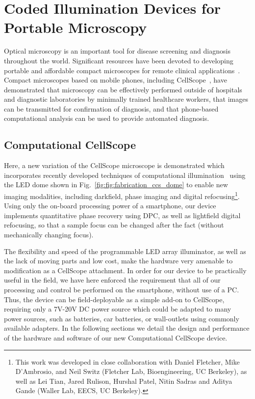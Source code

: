 \section{Coded Illumination Devices for Portable Microscopy}
Optical microscopy is an important tool for disease screening and diagnosis throughout the world. Significant resources have been devoted to developing portable and affordable compact microscopes for remote clinical applications~\cite{Zhu2011, switz2014low, smith2011cell, maamari2013mobile,C4LC00010B,Vashist2014, steenblik2005lenses, cybulski2014foldscope, boppart2014point, Greenbaum17122014, mudanyali2010compact, tseng2010lensfree}.
Compact microscopes based on mobile phones, including CellScope~\cite{breslauer2009mobile, skandarajah2014quantitative}, have demonstrated that microscopy can be effectively performed outside of hospitals and diagnostic laboratories by minimally trained healthcare workers, that images can be transmitted for confirmation of diagnosis, and that phone-based computational analysis can be used to provide automated diagnosis.

\subsection{Computational CellScope}\label{sec:fabrication:ccs}
Here, a new variation of the CellScope microscope is demonstrated which incorporates recently developed techniques of computational illumination~\cite{Zheng2011, Tian14, zijiMulti} using the LED dome shown in Fig.~\ref{fig:fig:fabrication_ccs_dome} to enable new imaging modalities, including darkfield, phase imaging and digital refocusing\footnote{This work was developed in close collaboration with Daniel Fletcher, Mike D'Ambrosio, and Neil Switz (Fletcher Lab, Bioengineering, UC Berkeley), as well as Lei Tian, Jared Rulison, Hurshal Patel, Nitin Sadras and Aditya Gande (Waller Lab, EECS, UC Berkeley).}. Using only the on-board processing power of a smartphone, our device implements quantitative phase recovery using DPC, as well as lightfield digital refocusing, so that a sample focus can be changed after the fact (without mechanically changing focus).

The flexibility and speed of the programmable LED array illuminator, as well as the lack of moving parts and low cost, make the hardware very amenable to modification as a CellScope attachment. In order for our device to be practically useful in the field, we have here enforced the requirement that all of our processing and control be performed on the smartphone, without use of a PC. Thus, the device can be field-deployable as a simple add-on to CellScope, requiring only a 7V-20V DC power source which could be adapted to many power sources, such as batteries, car batteries, or wall-outlets using commonly available adapters. In the following sections we detail the design and performance of the hardware and software of our new Computational CellScope device.

